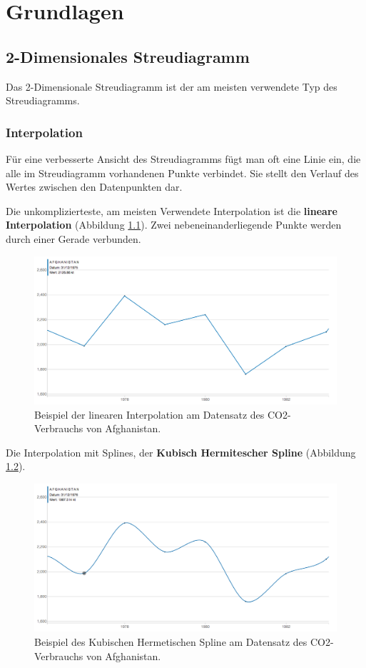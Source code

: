 \chapter{Grundlagen}

\section{2-Dimensionales Streudiagramm}
Das 2-Dimensionale Streudiagramm ist der am meisten verwendete Typ des Streudiagramms.

\subsection{Interpolation}
Für eine verbesserte Ansicht des Streudiagramms fügt man oft eine Linie ein, die alle im Streudiagramm vorhandenen Punkte verbindet. Sie stellt den Verlauf des Wertes zwischen den Datenpunkten dar.

Die unkomplizierteste, am meisten Verwendete Interpolation ist die \textbf{lineare Interpolation} (Abbildung \ref{fig:linear}). Zwei nebeneinanderliegende Punkte werden durch einer Gerade verbunden.

\begin{figure}[htbp]
	\centering
	\includegraphics[width=0.80\linewidth]{images/linear}
	\caption[Lineare Interpolation]{Beispiel der linearen Interpolation am Datensatz des CO2-Verbrauchs von Afghanistan.}
	\label{fig:linear}
\end{figure}

Die Interpolation mit Splines, der \textbf{Kubisch Hermitescher Spline} (Abbildung \ref{fig:cardinal}).

\begin{figure}[htbp]
	\centering
	\includegraphics[width=0.80\linewidth]{images/cardinal}
	\caption[Kubischer Hermitescher Spline]{Beispiel des Kubischen Hermetischen Spline am Datensatz des CO2-Verbrauchs von Afghanistan.}
	\label{fig:cardinal}
\end{figure}

